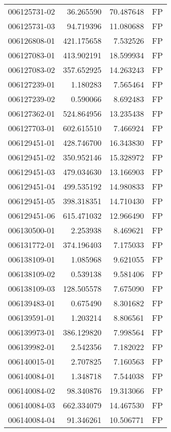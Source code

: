 \begin{tabular}{lrrl}
006125731-02 &   36.265590 &    70.487648 &   FP \\
006125731-03 &   94.719396 &    11.080688 &   FP \\
006126808-01 &  421.175658 &     7.532526 &   FP \\
006127083-01 &  413.902191 &    18.599934 &   FP \\
006127083-02 &  357.652925 &    14.263243 &   FP \\
006127239-01 &    1.180283 &     7.565464 &   FP \\
006127239-02 &    0.590066 &     8.692483 &   FP \\
006127362-01 &  524.864956 &    13.235438 &   FP \\
006127703-01 &  602.615510 &     7.466924 &   FP \\
006129451-01 &  428.746700 &    16.343830 &   FP \\
006129451-02 &  350.952146 &    15.328972 &   FP \\
006129451-03 &  479.034630 &    13.166903 &   FP \\
006129451-04 &  499.535192 &    14.980833 &   FP \\
006129451-05 &  398.318351 &    14.710430 &   FP \\
006129451-06 &  615.471032 &    12.966490 &   FP \\
006130500-01 &    2.253938 &     8.469621 &   FP \\
006131772-01 &  374.196403 &     7.175033 &   FP \\
006138109-01 &    1.085968 &     9.621055 &   FP \\
006138109-02 &    0.539138 &     9.581406 &   FP \\
006138109-03 &  128.505578 &     7.675090 &   FP \\
006139483-01 &    0.675490 &     8.301682 &   FP \\
006139591-01 &    1.203214 &     8.806561 &   FP \\
006139973-01 &  386.129820 &     7.998564 &   FP \\
006139982-01 &    2.542356 &     7.182022 &   FP \\
006140015-01 &    2.707825 &     7.160563 &   FP \\
006140084-01 &    1.348718 &     7.544038 &   FP \\
006140084-02 &   98.340876 &    19.313066 &   FP \\
006140084-03 &  662.334079 &    14.467530 &   FP \\
006140084-04 &   91.346261 &    10.506771 &   FP \\

\end{tabular}
